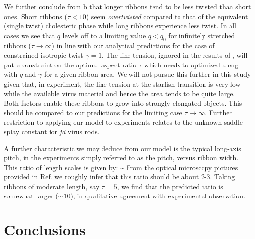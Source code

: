 We further conclude from b that longer ribbons tend to be less twisted than short ones.   Short ribbons ($\tau <10$) seem {\em overtwisted} compared to that of the equivalent (single twist) cholesteric phase while long ribbons experience less twist. In all cases we see that $q$ levels off to a limiting value $q < q_{0}$ for infinitely stretched ribbons ($\tau \rightarrow \infty$) in line with our analytical predictions for the case of constrained isotropic twist $\gamma =1$. The line tension, ignored in the results of , will put a constraint on the optimal aspect ratio $\tau$ which needs to optimized along with $q$ and $\gamma$ for a given ribbon area. We will not pursue this further in this study given that, in experiment, the line tension at the starfish transition is very low while the available virus material and hence the area tends to be quite large. Both  factors enable these ribbons to grow into strongly elongated objects. This should be compared to our predictions for the limiting case $\tau \rightarrow \infty$. Further restriction  to applying our model to experiments relates to the unknown saddle-splay constant for {\em fd} virus rods. 

A further characteristic we may deduce from our model is the typical long-axis pitch, in the experiments simply referred to as the pitch,  versus ribbon width.  This ratio of length scales is given by:
\beq
{} \sim {} 
\eeq
From the optical microscopy pictures provided in Ref.  \cite{Gibaud2014} we roughly infer that this ratio should be about 2-3. Taking ribbons of moderate length, say  $\tau = 5$, we find that the predicted ratio is somewhat larger ($\sim 10$), in qualitative agreement with experimental observation.




\section{Conclusions}




\clearpage








